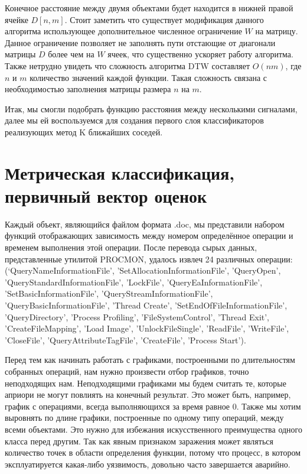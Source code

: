 Конечное расстояние между двумя объектами будет находится в  нижней правой ячейке $D[n, m]$. Стоит заметить что существует модификация данного алгоритма использующее дополнительное численное ограничение $W$ на матрицу. Данное ограничение позволяет не заполнять пути отстающие от диагонали матрицы $D$ более чем на $W$ ячеек, что существенно ускоряет работу алгоритма. Также нетрудно увидеть что сложность алгоритма DTW составляет $O(n m)$, где $n$ и $m$ количество значений каждой функции. Такая сложность связана с необходимостью заполнения матрицы размера $n$ на $m$. 

Итак, мы смогли подобрать функцию расстояния между несколькими сигналами, далее мы ей воспользуемся для создания первого слоя классификаторов реализующих метод K ближайших соседей.

\section{Метрическая классификация, первичный вектор оценок}

Каждый объект, являющийся файлом формата .doc, мы представили набором функций отображающих зависимость между номером определённое операции и временем выполнения этой операции. После перевода сырых данных, представленные утилитой PROCMON, удалось извлеч 24 различных операции: (‘QueryNameInformationFile', 'SetAllocationInformationFile', 'QueryOpen', 'QueryStandardInformationFile', 'LockFile', 'QueryEaInformationFile', 'SetBasicInformationFile', 'QueryStreamInformationFile', 'QueryBasicInformationFile', 'Thread Create', 'SetEndOfFileInformationFile', 'QueryDirectory', 'Process Profiling', 'FileSystemControl', 'Thread Exit', 'CreateFileMapping', 'Load Image', 'UnlockFileSingle', 'ReadFile', 'WriteFile', 'CloseFile', 'QueryAttributeTagFile', 'CreateFile', 'Process Start’). 

Перед тем как начинать работать с графиками, построенными по длительностям собранных операций, нам нужно произвести отбор графиков, точно неподходящих нам. Неподходящими графиками мы будем считать те, которые априори не могут повлиять на конечный результат. Это может быть, например, график с операциями, всегда выполняющихся за время равное 0. Также мы хотим выровнять по длине графики, построенные по одному типу операций, между всеми объектами. Это нужно для избежания искусственного преимущества одного класса перед другим. Так как явным признаком заражения может являться количество точек в области определения функции, потому что процесс, в котором эксплуатируется какая-либо уязвимость, довольно часто завершается аварийно. 

